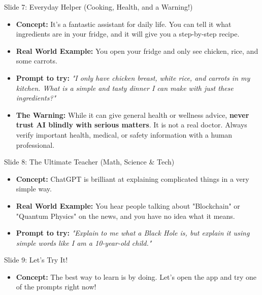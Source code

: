 \documentclass[aspectratio=169]{beamer}
\begin{document}
\begin{frame}{Slide 7: Everyday Helper (Cooking, Health, and a Warning!)}
    \begin{itemize}
        \item \textbf{Concept:} It’s a fantastic assistant for daily life. You can tell it what ingredients are in your fridge, and it will give you a step-by-step recipe.
        \item \textbf{Real World Example:} You open your fridge and only see chicken, rice, and some carrots.
        \item \textbf{Prompt to try:} \textit{"I only have chicken breast, white rice, and carrots in my kitchen. What is a simple and tasty dinner I can make with just these ingredients?"}
        \item \textbf{The Warning:} While it can give general health or wellness advice, \textbf{never trust AI blindly with serious matters}. It is not a real doctor. Always verify important health, medical, or safety information with a human professional.
    \end{itemize}
\end{frame}

\begin{frame}{Slide 8: The Ultimate Teacher (Math, Science \& Tech)}
    \begin{itemize}
        \item \textbf{Concept:} ChatGPT is brilliant at explaining complicated things in a very simple way.
        \item \textbf{Real World Example:} You hear people talking about "Blockchain" or "Quantum Physics" on the news, and you have no idea what it means.
        \item \textbf{Prompt to try:} \textit{"Explain to me what a Black Hole is, but explain it using simple words like I am a 10-year-old child."}
    \end{itemize}
\end{frame}

\begin{frame}{Slide 9: Let's Try It!}
    \begin{itemize}
        \item \textbf{Concept:} The best way to learn is by doing. Let's open the app and try one of the prompts right now!
    \end{itemize}
\end{frame}
\end{document}
